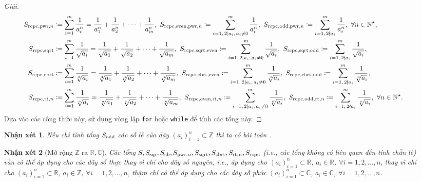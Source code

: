\documentclass{article}
\newtheorem{nhanxet}{Nhận xét}
\begin{document}
\begin{proof}[Giải]
\begin{align*}
		S_{{\rm rcpc,pwr},n}&\coloneqq\sum_{i=1}^m \frac{1}{a_i^n} = \frac{1}{a_1^n} + \frac{1}{a_2^n} + \cdots + \frac{1}{a_m^n},\ S_{{\rm rcpc,even,pwr},n}\coloneqq\sum_{i=1,\,2\mid a_i,\,a_i\ne0}^m \frac{1}{a_i^n},\ S_{{\rm rcpc,odd,pwr},n}\coloneqq\sum_{i=1,\,2\nmid a_i}^m \frac{1}{a_i^n},\ \forall n\in\mathbb{N}^\star,\\
		S_{\rm rcpc,sqrt}&\coloneqq\sum_{i=1}^m \frac{1}{\sqrt{a_i}} = \frac{1}{\sqrt{a_1}} + \frac{1}{\sqrt{a_2}} + \cdots + \frac{1}{\sqrt{a_m}},\ S_{\rm rcpc,sqrt,even}\coloneqq\sum_{i=1,\,2\mid a_i,\,a_i\ne0}^m \frac{1}{\sqrt{a_i}},\ S_{\rm rcpc,sqrt,odd}\coloneqq\sum_{i=1,\,2\nmid a_i}^m \frac{1}{\sqrt{a_i}},\\
		S_{\rm rcpc,cbrt}&\coloneqq\sum_{i=1}^m \frac{1}{\sqrt[3]{a_i}} = \frac{1}{\sqrt[3]{a_1}} + \frac{1}{\sqrt[3]{a_2}} + \cdots + \frac{1}{\sqrt[3]{a_m}},\ S_{\rm rcpc,cbrt,even}\coloneqq\sum_{i=1,\,2\mid a_i,\,a_i\ne0}^m \frac{1}{\sqrt[3]{a_i}},\ S_{\rm rcpc,cbrt,odd}\coloneqq\sum_{i=1,\,2\nmid a_i}^m \frac{1}{\sqrt[3]{a_i}},\\
		S_{{\rm rcpc,rt},n}&\coloneqq\sum_{i=1}^m \frac{1}{\sqrt[n]{a_i}} = \frac{1}{\sqrt[n]{a_1}} + \frac{1}{\sqrt[n]{a_2}} + \cdots + \frac{1}{\sqrt[n]{a_m}},\ S_{{\rm rcpc,even,rt},n}\coloneqq\sum_{i=1,\,2\mid a_i,\,a_i\ne0}^m \frac{1}{\sqrt[n]{a_i}},\ S_{{\rm rcpc,odd,rt},n}\coloneqq\sum_{i=1,\,2\nmid a_i}^m \frac{1}{\sqrt[n]{a_i}},\ \forall n\in\mathbb{N}^\star.
	\end{align*}
	Dựa vào các công thức này, sử dụng vòng lặp {\tt for} hoặc {\tt while} để tính các tổng này.
\end{proof}

\begin{nhanxet}
	Nếu chỉ tính tổng $S_{\rm odd}$ các số lẻ của dãy $(a_i)_{i=1}^n\subset\mathbb{Z}$ thì ta có bài toán \emph{\cite[3., p. 25, Tây Ninh 2019]{VietSTEM2021}}.
\end{nhanxet}

\begin{nhanxet}[Mở rộng $\mathbb{Z}$ ra $\mathbb{R},\mathbb{C}$]
	Các tổng $S,S_{\rm sqr},S_{\rm cb},S_{{\rm pwr},n},S_{\rm sqrt},S_{\rm cbrt},S_{{\rm rt},n},S_{\rm rcpc}$ (i.e., các tổng không có liên quan đến tính chẵn lẻ) vẫn có thể áp dụng cho các dãy số thực thay vì chỉ cho dãy số nguyên, i.e., áp dụng cho $(a_i)_{i=1}^n\subset\mathbb{R}$, $a_i\in\mathbb{R}$, $\forall i = 1,2,\ldots,n$, thay vì chỉ cho $(a_i)_{i=1}^n\subset\mathbb{R}$, $a_i\in\mathbb{Z}$, $\forall i = 1,2,\ldots,n$, thậm chí có thể áp dụng cho các dãy số phức $(a_i)_{i=1}^n\subset\mathbb{C}$, $a_i\in\mathbb{C}$, $\forall i = 1,2,\ldots,n$.
\end{nhanxet}
\end{document}
